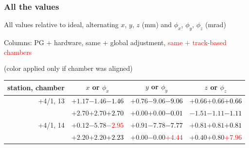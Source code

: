 \documentclass[compress]{beamer}
\begin{document}
\begin{frame}
\frametitle{All the values}
\tiny

All values relative to ideal, alternating $x$, $y$, $z$ (mm) and $\phi_x$, $\phi_y$, $\phi_z$ (mrad)

Columns: PG $+$ hardware, same $+$ global adjustment, \textcolor{red}{same $+$ track-based chambers}

\hfill (color applied only if chamber was aligned)

\vfill
\renewcommand{\arraystretch}{1.1}
\begin{tabular}{r | c | c | c}
station, chamber & $x$ or $\phi_x$ & $y$ or $\phi_y$ & $z$ or $\phi_z$ \\\hline
$+$4/1, 13 & $+1.17$\hspace{0.1 cm}$-1.46$\hspace{0.1 cm}\textcolor{black}{$-1.46$} & $+0.76$\hspace{0.1 cm}$-9.06$\hspace{0.1 cm}\textcolor{black}{$-9.06$} & $+0.66$\hspace{0.1 cm}$+0.66$\hspace{0.1 cm}\textcolor{black}{$+0.66$} \\
           & $+2.70$\hspace{0.1 cm}$+2.70$\hspace{0.1 cm}\textcolor{black}{$+2.70$} & $+0.00$\hspace{0.1 cm}$+0.00$\hspace{0.1 cm}\textcolor{black}{$-0.01$} & $-1.51$\hspace{0.1 cm}$-1.11$\hspace{0.1 cm}\textcolor{black}{$-1.11$} \\
$+$4/1, 14 & $+0.12$\hspace{0.1 cm}$-5.78$\hspace{0.1 cm}\textcolor{red}{$-2.95$} & $+0.91$\hspace{0.1 cm}$-7.78$\hspace{0.1 cm}\textcolor{black}{$-7.77$} & $+0.81$\hspace{0.1 cm}$+0.81$\hspace{0.1 cm}\textcolor{black}{$+0.81$} \\
           & $+2.20$\hspace{0.1 cm}$+2.20$\hspace{0.1 cm}\textcolor{black}{$+2.23$} & $+0.00$\hspace{0.1 cm}$-0.00$\hspace{0.1 cm}\textcolor{red}{$+4.44$} & $+0.40$\hspace{0.1 cm}$+0.80$\hspace{0.1 cm}\textcolor{red}{$+7.96$} \\

\end{tabular}
\end{frame}
\end{document}
